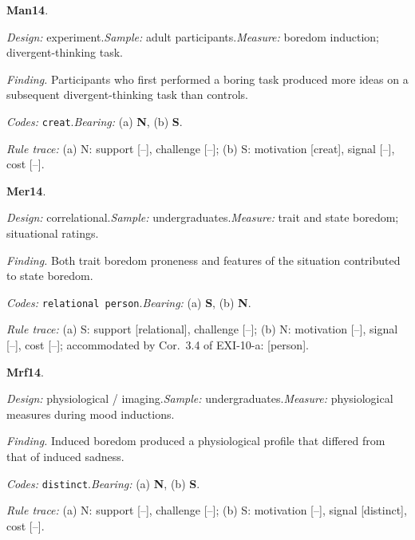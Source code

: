 \medskip
{}
\noindent\textbf{Man14}\enspace \citet{MannCadman2014}.\par
{\small\noindent\textit{Design:} experiment.\quad \textit{Sample:} adult participants.\quad \textit{Measure:} boredom induction; divergent-thinking task.\par
\noindent\textit{Finding.} Participants who first performed a boring task produced more ideas on a subsequent divergent-thinking task than controls.\par
\noindent\textit{Codes:} \texttt{creat}.\quad \textit{Bearing:} (a) \textbf{N}, (b) \textbf{S}.\par
\noindent\textit{Rule trace:} (a) N: support {[}--{]}, challenge {[}--{]}; (b) S: motivation {[}creat{]}, signal {[}--{]}, cost {[}--{]}.\par}
\medskip
{}
\noindent\textbf{Mer14}\enspace \citet{MercerLynn2014}.\par
{\small\noindent\textit{Design:} correlational.\quad \textit{Sample:} undergraduates.\quad \textit{Measure:} trait and state boredom; situational ratings.\par
\noindent\textit{Finding.} Both trait boredom proneness and features of the situation contributed to state boredom.\par
\noindent\textit{Codes:} \texttt{relational person}.\quad \textit{Bearing:} (a) \textbf{S}, (b) \textbf{N}.\par
\noindent\textit{Rule trace:} (a) S: support {[}relational{]}, challenge {[}--{]}; (b) N: motivation {[}--{]}, signal {[}--{]}, cost {[}--{]}; accommodated by Cor.~3.4 of EXI-10-a: {[}person{]}.\par}
\medskip
{}
\noindent\textbf{Mrf14}\enspace \citet{MerrifieldDanckert2014}.\par
{\small\noindent\textit{Design:} physiological / imaging.\quad \textit{Sample:} undergraduates.\quad \textit{Measure:} physiological measures during mood inductions.\par
\noindent\textit{Finding.} Induced boredom produced a physiological profile that differed from that of induced sadness.\par
\noindent\textit{Codes:} \texttt{distinct}.\quad \textit{Bearing:} (a) \textbf{N}, (b) \textbf{S}.\par
\noindent\textit{Rule trace:} (a) N: support {[}--{]}, challenge {[}--{]}; (b) S: motivation {[}--{]}, signal {[}distinct{]}, cost {[}--{]}.\par}
\medskip
{}

